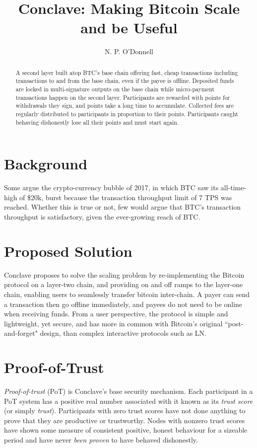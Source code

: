 \documentclass{article}
\title{Conclave: Making Bitcoin Scale and be Useful}
\author{N. P. O'Donnell}
\begin{document}
\maketitle
\begin{abstract}
A second layer built atop BTC's base chain offering fast, cheap transactions including transactions to and from the 
base chain, even if the payee is offline. Deposited funds are locked in multi-signature outputs on the base chain while
micro-payment transactions happen on the second layer. Participants are rewarded with points for withdrawals they sign, 
and points take a long time to accumulate. Collected fees are regularly distributed to participants in proportion to 
their points. Participants caught behaving dishonestly lose all their points and must start again.
\end{abstract}

\section{Background}

Some argue the crypto-currency bubble of 2017, in which BTC saw its all-time-high of \$20k, burst because the transaction throughput limit of 7 TPS was reached. Whether this is true or not, few would argue that BTC's transaction throughput is satisfactory, given the ever-growing reach of BTC.

\section{Proposed Solution}

Conclave proposes to solve the scaling problem by re-implementing the Bitcoin protocol on a layer-two chain, and providing on and off ramps to the layer-one chain, enabling users to seamlessly transfer bitcoin inter-chain. A payer can send a transaction then go offline immediately, and payees do not need to be online when receiving funds. From a user perspective, the protocol is simple and lightweight, yet secure, and has more in common with Bitcoin's original ``post-and-forget" design, than complex interactive protocols such as LN. \\

\section{Proof-of-Trust}

\textit{Proof-of-trust} (PoT) is Conclave's base security mechanism. Each participant in a PoT system has a positive real number associated with it known as its \textit{trust score} (or simply \textit{trust}). Participants with zero trust scores have not done anything to prove that they are productive or trustworthy. Nodes with nonzero trust scores have shown some measure of consistent positive, honest behaviour for a sizeable period and have never \textit{been proven} to have behaved dishonestly.
\end{document}
